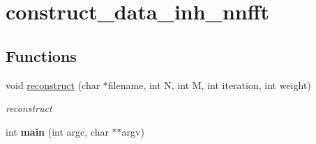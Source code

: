 \hypertarget{group__applications__mri2d__construct__data__inh__nnfft}{
\section{construct\_\-data\_\-inh\_\-nnfft}
\label{group__applications__mri2d__construct__data__inh__nnfft}
}
\subsection*{Functions}
\begin{CompactItemize}
\item 
\hypertarget{group__applications__mri2d__construct__data__inh__nnfft_ga0}{
void \hyperlink{group__applications__mri2d__construct__data__inh__nnfft_ga0}{reconstruct} (char $\ast$filename, int N, int M, int iteration, int weight)}
\label{group__applications__mri2d__construct__data__inh__nnfft_ga0}

\begin{CompactList}\small\item\em reconstruct \item\end{CompactList}\item 
\hypertarget{group__applications__mri2d__construct__data__inh__nnfft_ga1}{
int {\bf main} (int argc, char $\ast$$\ast$argv)}
\label{group__applications__mri2d__construct__data__inh__nnfft_ga1}

\end{CompactItemize}
